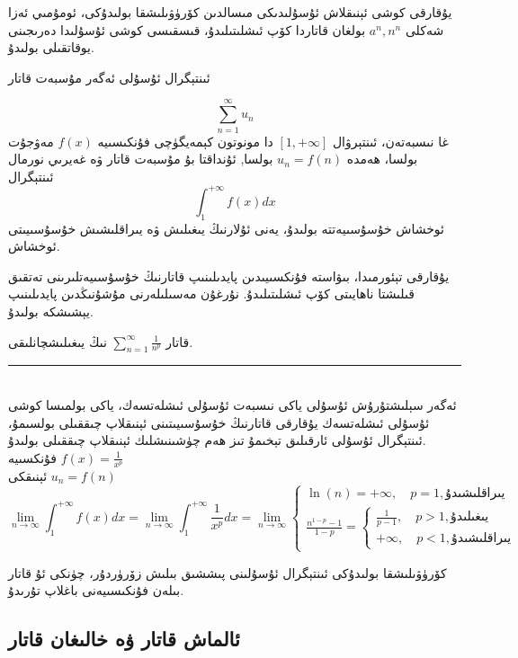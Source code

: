 يۇقارقى كوشى ئېنىقلاش ئۇسۇلىدىكى مىسالدىن كۆرۈۋىلىشقا بولىدۇكى، ئومۇمىي ئەزا شەكلى 
$a^n,n^n$
بولغان قاتاردا كۆپ ئىشلىتىلىدۇ، قىسقىسى كوشى ئۇسۇلىدا دەرىجىنى يوقاتقىلى بولىدۇ.
\begin{MyTheorem}{ئىنتېگرال ئۇسۇلى}{}%
	ئەگەر مۇسبەت قاتار
	
	$$\sum\limits_{n=1}^\infty u_n$$
	غا نىسبەتەن، ئىنتېرۋال $[1,+\infty]$ دا مونوتون كېمەيگۈچى فۇنكىسىيە $f(x)$ مەۋجۇت بولسا، ھەمدە $u_n=f(n)$ بولسا, ئۇنداقتا بۇ مۇسبەت قاتار ۋە غەيرىي نورمال ئىنتېگرال
	$$\int_{1}^{+\infty}f(x)dx$$
	ئوخشاش خۇسۇسىيەتتە بولىدۇ، يەنى ئۇلارنىڭ يىغىلىش ۋە يىراقلىشىش خۇسۇسىيىتى ئوخشاش.
\end{MyTheorem}
يۇقارقى تېئورمىدا، بىۋاستە فۇنكسىيىدىن پايدىلىنىپ قاتارنىڭ خۇسۇسىيەتلىرىنى تەتقىق قىلىشتا ناھايىتى كۆپ ئىشلىتىلىدۇ. نۇرغۇن مەسىلىلەرنى مۇشۇنىڭدىن پايدىلىنىپ يېشىشكە بولىدۇ.
\begin{myexample}
قاتار
$\sum\limits_{n=1}^\infty \frac{1}{n^p}$
نىڭ يىغىلىشچانلىقى.
\\\rule{\linewidth}{0.05em}\\
ئەگەر سېلىشتۇرۇش ئۇسۇلى ياكى نىسبەت ئۇسۇلى ئىشلەتسەك، ياكى بولمىسا كوشى ئۇسۇلى ئىشلەتسەك يۇقارقى قاتارنىڭ خۇسۇسىيىتىنى ئېنىقلاپ چىققىلى بولسىمۇ، ئىنتېگرال ئۇسۇلى ئارقىلىق تېخىمۇ تىز ھەم چۈشىنىشلىك ئېنىقلاپ چىققىلى بولىدۇ.\\
فۇنكسىيە 
$f(x) = \frac{1}{x^p}$\\
ئېنىقكى 
$u_n = f(n)$
$$
\lim\limits_{n \to \infty} \int_{1}^{+\infty}f(x)dx =
\lim\limits_{n \to \infty} \int_{1}^{+\infty} \frac{1}{x^p}dx = \lim\limits_{n \to \infty}
\left\{\begin{array}{l}
	\ln(n)=+\infty, \quad p=1, \text{يىراقلىشىدۇ}\\
	\frac{n^{1-p}-1}{1-p} = 
	\left\{\begin{array}{l}
		\frac{1}{p-1}, \quad p>1, \text{يىغىلىدۇ}\\
		+\infty, \quad p < 1, \text{يىراقلىشىدۇ}
	\end{array}\right.
\end{array}\right.
$$
\end{myexample}
كۆرۈۋىلىشقا بولىدۇكى ئىنتېگرال ئۇسۇلىنى پىششىق بىلىش زۆرۈردۇر، چۈنكى ئۇ قاتار بىلەن فۇنكىسىيەنى باغلاپ تۇرىدۇ.
\subsection{ئالماش قاتار ۋە خالىغان قاتار}
